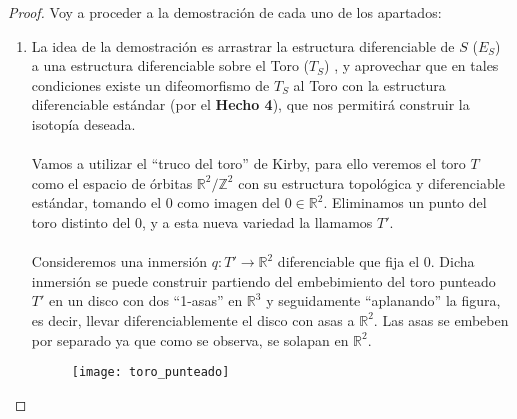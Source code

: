 \begin{proof}
	Voy a proceder a la demostración de cada uno de los apartados: \\
	\begin{enumerate}
		\item La idea de la demostración es arrastrar la estructura diferenciable de $S$ ($E_S$) a una estructura diferenciable sobre el Toro ($T_S$) , y aprovechar que en tales condiciones existe un difeomorfismo de $T_S$ al Toro con la estructura diferenciable estándar (por el \textbf{Hecho 4}), que nos permitirá construir la isotopía deseada.\\
			\\ Vamos a utilizar el ``truco del toro'' de Kirby, para ello veremos el toro $T$ como el espacio de órbitas $\mathbb{R}^2/\mathbb{Z}^2$ con su estructura topológica y diferenciable estándar, tomando el $0$ como imagen del $0\in \mathbb{R}^2$. Eliminamos un punto del toro distinto del $0$, y a esta nueva variedad la llamamos $T'$. \\
			\\ Consideremos una inmersión $q: T' \rightarrow \mathbb{R}^2$ diferenciable que fija el $0$. Dicha inmersión se puede construir partiendo del embebimiento del toro punteado $T'$ en un disco con dos ``1-asas'' en $\mathbb{R}^3$ y seguidamente ``aplanando'' la figura, es decir, llevar diferenciablemente el disco con asas a $\mathbb{R}^2$. Las asas se embeben por separado ya que como se observa, se solapan en $\mathbb{R}^2$.\\
			
			\begin{figure}[h]
  				\centering
  				\texttt{[image: toro\_punteado]}
  				\label{fig:toro_punteado}
			\end{figure}
			

\end{enumerate}
\end{proof}
